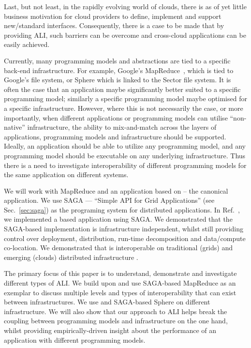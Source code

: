 \documentclass[3p,twocolumn]{elsarticle}
\begin{document}
Last, but not least, in the rapidly evolving world of clouds, there is
as of yet little business motivation for cloud providers to define,
implement and support new/standard interfaces. Consequently, there is
a case to be made that by providing ALI, such barriers can be overcome
and cross-cloud applications can be easily achieved.

Currently, many programming models and abstractions are tied to a
specific back-end infrastructure.  For example, Google's
MapReduce~\cite{mapreduce-paper}, which is tied to Google's file
system, or Sphere\cite{sectorsphere09} which is linked to the Sector
file system.  It is often the case that an application maybe
significantly better suited to a specific programming model; similarly
a specific programming model maybe optimised for a specific
infrastructure. However, where this is not necessarily the case, or
more importantly, when different applications or programming models
can utilise ``non-native'' infrastructure, the ability to
mix-and-match across the layers of applications, programming models
and infrastructure should be supported.  Ideally, an application
should be able to utilize any programming model, and any programming
model should be executable on any underlying infrastructure.  Thus
there is a need to investigate interoperability of different
programming models for the same application on different systems.

We will work with MapReduce and an application based on \mr -- the
canonical \wc application.  We use SAGA --- “Simple API for Grid
Applications'' (see Sec.~\ref{sec:saga}) as the programing system for
distributed applications.  In Ref.~\cite{saga_ccgrid09}, we
implemented a \mr based \wc application using SAGA.  We demonstrated
that the SAGA-based implementation is infrastructure independent,
whilst still providing control over deployment, distribution, run-time
decomposition and data/compute co-location.  We demonstrated that
\sagamapreduce is interoperable on traditional (grids) and emerging
(clouds) distributed infrastructure .

The primary focus of this paper is to understand, demonstrate and
investigate different types of ALI. We build upon and use SAGA-based
MapReduce as an exemplar to discuss multiple levels and types of
interoperability that can exist between infrastructures. We use
\sagamapreduce and SAGA-based Sphere on different infrastructure. We
will also show that our approach to ALI helps break the coupling
between programming models and infrastructure on the one hand, whilst
providing empirically-driven insight about the performance of an
application with different programming models.
\end{document}
